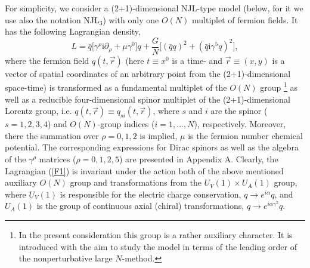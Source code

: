 \documentclass[12pt,a4paper]{article}
\begin{document}
For simplicity, we consider a (2+1)-dimensional NJL-type model (below, for it we use also the
notation NJL$_3$) with only one $O(N)$ multiplet of fermion fields. It has the following Lagrangian density,
\begin{equation}
L=\bar q\Big [\gamma^\rho\mathrm{i}\partial_\rho
+\mu\gamma^0\Big ]q+ \frac {G}{N}\Big
[(\bar qq)^2+(\bar q\mathrm{i}\gamma^5 q)^2 \Big ],
\label{F1}
\end{equation}
where the fermion field $q(t,\vec r)$ (here $t\equiv x^0$ is a time- and
$\vec r\equiv (x,y)$ is a vector of spatial coordinates of an arbitrary point from the
(2+1)-dimensional space-time) is transformed as a fundamental multiplet of the $O(N)$ group
\footnote{In the present consideration this group is a rather auxiliary character. It is
introduced with the aim to study the model in terms of the leading order of the nonperturbative
large $N$-method.}
as well as a reducible four-dimensional spinor multiplet of the (2+1)-dimensional Lorentz group,
i.e. $q(t,\vec r)\equiv q_{si}(t,\vec r)$, where $s$ and $i$ are the spinor ($s=1,2,3,4$) and
$O(N)$-group indices ($i=1,...,N$), respectively. Moreover, there the
summation over $\rho =0,1,2$ is implied, $\mu$ is the fermion number chemical potential. The
corresponding expressions for Dirac spinors as well as the algebra of the
$\gamma^\rho$ matrices ($\rho=0,1,2,5$) are presented in Appendix A.  Clearly, the Lagrangian
(\ref{F1}) is invariant under the action both of the above mentioned auxiliary $O(N)$ group and
transformations from the $U_V(1)\times U_A(1)$ group, where $U_V(1)$ is responsible for
the electric charge conservation, $q\to e^{i\alpha}q$, and $U_A(1)$ is the group of continuous
axial (chiral) transformations, $q\to e^{i\alpha\gamma^5}q$.
\end{document}
